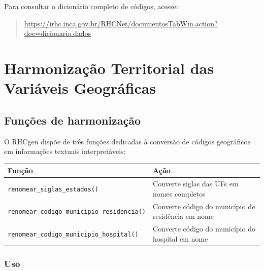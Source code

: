 \documentclass[
  brazilian,
  a4paper,
  oneside]{scrbook}
\newcounter{none} %
\begin{document}
Para consultar o dicionário completo de códigos, acesse:

\begin{quote}
\url{https://irhc.inca.gov.br/RHCNet/documentosTabWin.action?doc=dicionario.dados}
\end{quote}


\chapter{Harmonização Territorial das Variáveis
Geográficas}\label{harmonizauxe7uxe3o-territorial-das-variuxe1veis-geogruxe1ficas}

\section{Funções de
harmonização}\label{funuxe7uxf5es-de-harmonizauxe7uxe3o}

O RHCgen dispõe de três funções dedicadas à conversão de códigos
geográficos em informações textuais interpretáveis:

{\def\LTcaptype{none} %
\begin{longtable}[]{@{}
  >{\raggedright\arraybackslash}p{}
  >{\raggedright\arraybackslash}p{}@{}}
\toprule\noalign{}
\begin{minipage}[b]{\linewidth}\raggedright
Função
\end{minipage} & \begin{minipage}[b]{\linewidth}\raggedright
Ação
\end{minipage} \\
\midrule\noalign{}
\endhead
\bottomrule\noalign{}
\endlastfoot
\texttt{renomear\_siglas\_estados()} & Converte siglas das UFs em nomes
completos \\
\texttt{renomear\_codigo\_municipio\_residencia()} & Converte código do
município de residência em nome \\
\texttt{renomear\_codigo\_municipio\_hospital()} & Converte código do
município do hospital em nome \\
\end{longtable}
}

\subsection{Uso}\label{uso-4}
\end{document}
